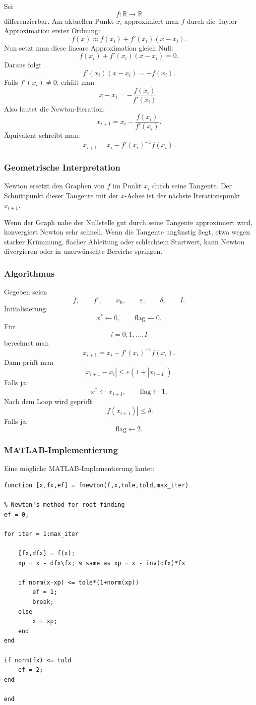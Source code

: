 \documentclass[10pt, letterpaper]{article}
\begin{document}
Sei
\[
f:\mathbb{R}\to\mathbb{R}
\]
differenzierbar. Am aktuellen Punkt \(x_i\) approximiert man \(f\) durch die Taylor-Approximation erster Ordnung:
\[
f(x)
\approx
f(x_i)+f'(x_i)(x-x_i).
\]
Nun setzt man diese lineare Approximation gleich Null:
\[
f(x_i)+f'(x_i)(x-x_i)=0.
\]
Daraus folgt
\[
f'(x_i)(x-x_i)=-f(x_i).
\]
Falls \(f'(x_i)\neq 0\), erhält man
\[
x-x_i=-\frac{f(x_i)}{f'(x_i)}.
\]
Also lautet die Newton-Iteration:
\[
\boxed{
x_{i+1}
=
x_i-\frac{f(x_i)}{f'(x_i)}.
}
\]
Äquivalent schreibt man:
\[
x_{i+1}
=
x_i-f'(x_i)^{-1}f(x_i).
\]

\subsubsection{Geometrische Interpretation}

Newton ersetzt den Graphen von \(f\) im Punkt \(x_i\) durch seine Tangente. Der Schnittpunkt dieser Tangente mit der \(x\)-Achse ist der nächste Iterationspunkt \(x_{i+1}\).

Wenn der Graph nahe der Nullstelle gut durch seine Tangente approximiert wird, konvergiert Newton sehr schnell. Wenn die Tangente ungünstig liegt, etwa wegen starker Krümmung, flacher Ableitung oder schlechtem Startwert, kann Newton divergieren oder in unerwünschte Bereiche springen.

\subsubsection{Algorithmus}

Gegeben seien
\[
f,\qquad f',\qquad x_0,\qquad \varepsilon,\qquad \delta,\qquad I.
\]
Initialisierung:
\[
x^\ast\leftarrow 0,
\qquad
\text{flag}\leftarrow 0.
\]
Für
\[
i=0,1,\dots,I
\]
berechnet man
\[
x_{i+1}
=
x_i-f'(x_i)^{-1}f(x_i).
\]
Dann prüft man
\[
|x_{i+1}-x_i|
\leq
\varepsilon(1+|x_{i+1}|).
\]
Falls ja:
\[
x^\ast\leftarrow x_{i+1},
\qquad
\text{flag}\leftarrow 1.
\]
Nach dem Loop wird geprüft:
\[
|f(x_{i+1})|\leq \delta.
\]
Falls ja:
\[
\text{flag}\leftarrow 2.
\]

\subsubsection{MATLAB-Implementierung}

Eine mögliche MATLAB-Implementierung lautet:

\begin{verbatim}
function [x,fx,ef] = fnewton(f,x,tole,told,max_iter)

% Newton's method for root-finding
ef = 0;

for iter = 1:max_iter

    [fx,dfx] = f(x);
    xp = x - dfx\fx; % same as xp = x - inv(dfx)*fx

    if norm(x-xp) <= tole*(1+norm(xp))
        ef = 1;
        break;
    else
        x = xp;
    end
end

if norm(fx) <= told
    ef = 2;
end

end
\end{verbatim}
\end{document}

